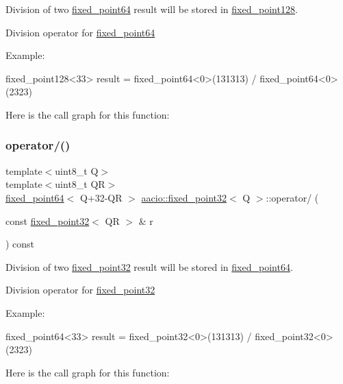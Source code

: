 Division of two \mbox{\hyperlink{structaacio_1_1fixed__point64}{fixed\+\_\+point64}} result will be stored in \mbox{\hyperlink{structaacio_1_1fixed__point128}{fixed\+\_\+point128}}. 

Division operator for \mbox{\hyperlink{structaacio_1_1fixed__point64}{fixed\+\_\+point64}}

Example\+: 
\begin{DoxyCode}
fixed\_point128<33> result = fixed\_point64<0>(131313) / fixed\_point64<0>(2323)
\end{DoxyCode}
 Here is the call graph for this function\+:
\mbox{\label{group__fixedpoint_ga47eb3555482ded843d054f02bae32c3e}} 
\subsubsection{\texorpdfstring{operator/()}{operator/()}\hspace{0.1cm}{\footnotesize\ttfamily [2/2]}}
{\footnotesize\ttfamily template$<$uint8\+\_\+t Q$>$ \\
template$<$uint8\+\_\+t QR$>$ \\
\mbox{\hyperlink{structaacio_1_1fixed__point64}{fixed\+\_\+point64}}$<$ Q+32-\/QR $>$ \mbox{\hyperlink{structaacio_1_1fixed__point32}{aacio\+::fixed\+\_\+point32}}$<$ Q $>$\+::operator/ (\begin{DoxyParamCaption}\item[{const \mbox{\hyperlink{structaacio_1_1fixed__point32}{fixed\+\_\+point32}}$<$ QR $>$ \&}]{r }\end{DoxyParamCaption}) const}



Division of two \mbox{\hyperlink{structaacio_1_1fixed__point32}{fixed\+\_\+point32}} result will be stored in \mbox{\hyperlink{structaacio_1_1fixed__point64}{fixed\+\_\+point64}}. 

Division operator for \mbox{\hyperlink{structaacio_1_1fixed__point32}{fixed\+\_\+point32}}

Example\+: 
\begin{DoxyCode}
fixed\_point64<33> result = fixed\_point32<0>(131313) / fixed\_point32<0>(2323)
\end{DoxyCode}
 Here is the call graph for this function\+:

